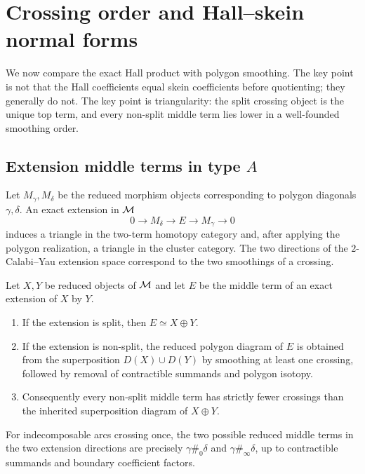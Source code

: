 \section{Crossing order and Hall--skein normal forms}
\label{sec:crossing}

We now compare the exact Hall product with polygon smoothing.  The key point is
not that the Hall coefficients equal skein coefficients before quotienting;
they generally do not.  The key point is triangularity: the split crossing
object is the unique top term, and every non-split middle term lies lower in a
well-founded smoothing order.

\subsection{Extension middle terms in type $A$}

Let $M_\gamma,M_\delta$ be the reduced morphism objects corresponding to
polygon diagonals $\gamma,\delta$.  An exact extension in $\mathcal M$
\[
 0\longrightarrow M_\delta\longrightarrow E\longrightarrow M_\gamma
 \longrightarrow0
\]
induces a triangle in the two-term homotopy category and, after applying the
polygon realization, a triangle in the cluster category.  The two directions
of the $2$-Calabi--Yau extension space correspond to the two smoothings of a
crossing.

\begin{theorem}
\label{thm:extension-smoothing}
Let $X,Y$ be reduced objects of $\mathcal M$ and let $E$ be the middle term of an
exact extension of $X$ by $Y$.
\begin{enumerate}[label=(\roman*),leftmargin=2.3em]
\item If the extension is split, then $E\simeq X\oplus Y$.
\item If the extension is non-split, the reduced polygon diagram of $E$ is
      obtained from the superposition $D(X)\cup D(Y)$ by smoothing at least
      one crossing, followed by removal of contractible summands and polygon
      isotopy.
\item Consequently every non-split middle term has strictly fewer crossings
      than the inherited superposition diagram of $X\oplus Y$.
\end{enumerate}
For indecomposable arcs crossing once, the two possible reduced middle terms
in the two extension directions are precisely
$\gamma\#_0\delta$ and $\gamma\#_\infty\delta$, up to contractible summands
and boundary coefficient factors.
\end{theorem}

